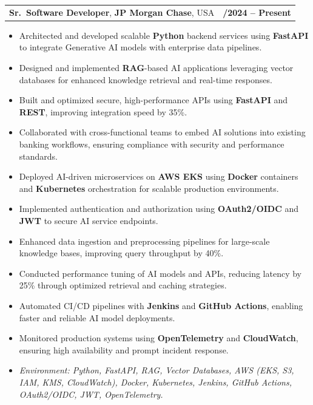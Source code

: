 \documentclass[letterpaper,11pt]{article}
\makeatletter
\newcommand{\resumeItem}[1]{
  \item\footnotesize{
    {#1 \vspace{-2pt}}
  }
}
\newcommand{\resumeSubheading}[4]{
  \vspace{-2pt}\item
    \begin{tabular*}{1.0\textwidth}[t]{l@{\extracolsep{\fill}}r}
      \textbf{\fontsize{10pt}{14pt}\selectfont #3}, \textbf{\fontsize{10pt}{14pt}\selectfont #1}, \fontsize{10pt}{14pt}\selectfont #4 & \textbf{\fontsize{10pt}{14pt}\selectfont #2} \\
    \end{tabular*}\vspace{-7pt}
}
\newcommand{\resumeItemListStart}{\begin{itemize}[leftmargin=*]}
\newcommand{\resumeItemListEnd}{\end{itemize}\vspace{-5pt}}
\makeatother
\begin{document}
\resumeSubheading
{JP Morgan Chase}{09/2024 -- Present}
{Sr.\ Software Developer}{USA}
\resumeItemListStart
  \resumeItem{Architected and developed scalable \textbf{Python} backend services using \textbf{FastAPI} to integrate Generative AI models with enterprise data pipelines.}
  \resumeItem{Designed and implemented \textbf{RAG}-based AI applications leveraging vector databases for enhanced knowledge retrieval and real-time responses.}
  \resumeItem{Built and optimized secure, high-performance APIs using \textbf{FastAPI} and \textbf{REST}, improving integration speed by 35\%.}
  \resumeItem{Collaborated with cross-functional teams to embed AI solutions into existing banking workflows, ensuring compliance with security and performance standards.}
  \resumeItem{Deployed AI-driven microservices on \textbf{AWS EKS} using \textbf{Docker} containers and \textbf{Kubernetes} orchestration for scalable production environments.}
  \resumeItem{Implemented authentication and authorization using \textbf{OAuth2/OIDC} and \textbf{JWT} to secure AI service endpoints.}
  \resumeItem{Enhanced data ingestion and preprocessing pipelines for large-scale knowledge bases, improving query throughput by 40\%.}
  \resumeItem{Conducted performance tuning of AI models and APIs, reducing latency by 25\% through optimized retrieval and caching strategies.}
  \resumeItem{Automated CI/CD pipelines with \textbf{Jenkins} and \textbf{GitHub Actions}, enabling faster and reliable AI model deployments.}
  \resumeItem{Monitored production systems using \textbf{OpenTelemetry} and \textbf{CloudWatch}, ensuring high availability and prompt incident response.}
  \resumeItem{\textit{Environment: Python, FastAPI, RAG, Vector Databases, AWS (EKS, S3, IAM, KMS, CloudWatch), Docker, Kubernetes, Jenkins, GitHub Actions, OAuth2/OIDC, JWT, OpenTelemetry.}}
\resumeItemListEnd
\end{document}
